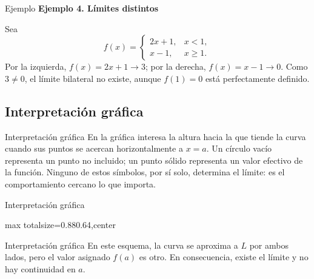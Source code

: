 \documentclass[12pt,aspectratio=169]{beamer}
\begin{document}
\begin{frame}[t,allowframebreaks]{Ejemplo}
{\color{azul}\bfseries Ejemplo 4. Límites distintos}\par\medskip

Sea
\[
f(x)=\begin{cases}
 2x+1,&x<1,\\
 x-1,&x\ge1.
\end{cases}
\]
Por la izquierda, $f(x)=2x+1\to3$; por la derecha, $f(x)=x-1\to0$. Como $3\ne0$, el límite bilateral no existe, aunque $f(1)=0$ está perfectamente definido.
\end{frame}


\subsection{Interpretación gráfica}

\begin{frame}[t,allowframebreaks]{Interpretación gráfica}
En la gráfica interesa la altura hacia la que tiende la curva cuando sus puntos se acercan horizontalmente a $x=a$. Un círculo vacío representa un punto no incluido; un punto sólido representa un valor efectivo de la función. Ninguno de estos símbolos, por sí solo, determina el límite: es el comportamiento cercano lo que importa.
\end{frame}


\begin{frame}[t,allowframebreaks]{Interpretación gráfica}
\begin{center}
\begin{adjustbox}{max totalsize={0.88\linewidth}{0.64\textheight},center}\end{adjustbox}
\end{center}
\end{frame}


\begin{frame}[t,allowframebreaks]{Interpretación gráfica}
En este esquema, la curva se aproxima a $L$ por ambos lados, pero el valor asignado $f(a)$ es otro. En consecuencia, existe el límite y no hay continuidad en $a$.

\end{frame}
\end{document}
